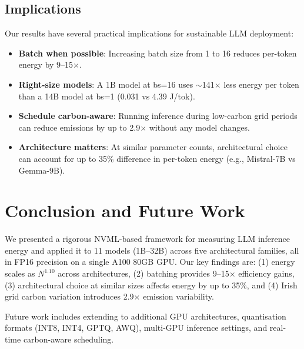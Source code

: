 \documentclass[conference]{IEEEtran}
\begin{document}
\subsection{Implications}

Our results have several practical implications for sustainable LLM deployment:
\begin{itemize}
    \item \textbf{Batch when possible}: Increasing batch size from 1 to 16 reduces per-token energy by 9--15$\times$.
    \item \textbf{Right-size models}: A 1B model at bs=16 uses $\sim$141$\times$ less energy per token than a 14B model at bs=1 (0.031 vs 4.39 J/tok).
    \item \textbf{Schedule carbon-aware}: Running inference during low-carbon grid periods can reduce emissions by up to 2.9$\times$ without any model changes.
    \item \textbf{Architecture matters}: At similar parameter counts, architectural choice can account for up to 35\% difference in per-token energy (e.g., Mistral-7B vs Gemma-9B).
\end{itemize}

\section{Conclusion and Future Work}

We presented a rigorous NVML-based framework for measuring LLM inference energy and applied it to 11 models (1B--32B) across five architectural families, all in FP16 precision on a single A100 80GB GPU. Our key findings are: (1) energy scales as $N^{1.10}$ across architectures, (2) batching provides 9--15$\times$ efficiency gains, (3) architectural choice at similar sizes affects energy by up to 35\%, and (4) Irish grid carbon variation introduces 2.9$\times$ emission variability.

Future work includes extending to additional GPU architectures, quantisation formats (INT8, INT4, GPTQ, AWQ), multi-GPU inference settings, and real-time carbon-aware scheduling.



\end{document}
